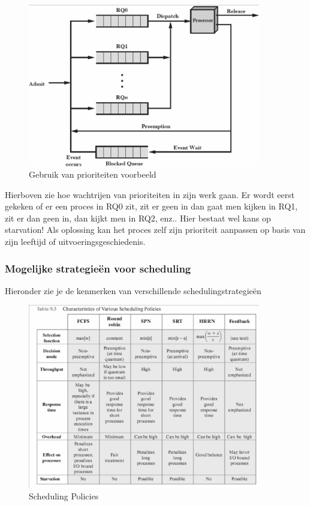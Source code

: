 \begin{figure}[htp]
    \centering
            \includegraphics[width=4in]{img/gebruikvanprioriteiten.png}
        \caption{Gebruik van prioriteiten voorbeeld}
    \label{fig:Gebruik van prioriteiten voorbeeld}
\end{figure}
 
Hierboven zie hoe wachtrijen van prioriteiten in zijn werk gaan. Er wordt eerst gekeken of er een proces in RQ0 zit, zit er geen in dan gaat men kijken in RQ1, zit er dan geen in, dan kijkt men in RQ2, enz.. Hier bestaat wel kans op starvation! Als oplossing kan het proces zelf zijn prioriteit aanpassen op basis van zijn leeftijd of uitvoeringsgeschiedenis.


\subsubsection{Mogelijke strategieën voor scheduling}

Hieronder zie je de kenmerken van verschillende schedulingstrategieën

\begin{figure}[htp]
    \centering
            \includegraphics[width=4in]{img/schedulingpolicies.png}
        \caption{Scheduling Policies}
    \label{fig:Scheduling Policies}
\end{figure}

